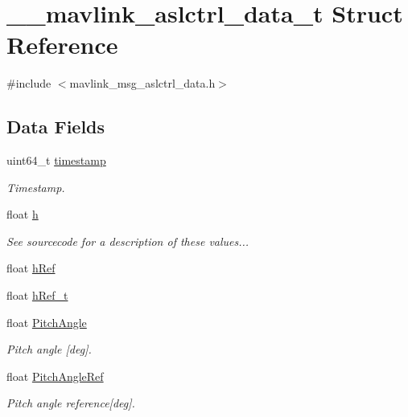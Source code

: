 \hypertarget{struct____mavlink__aslctrl__data__t}{\section{\+\_\+\+\_\+mavlink\+\_\+aslctrl\+\_\+data\+\_\+t Struct Reference}
\label{struct____mavlink__aslctrl__data__t}
}


{\ttfamily \#include $<$mavlink\+\_\+msg\+\_\+aslctrl\+\_\+data.\+h$>$}

\subsection*{Data Fields}
\begin{DoxyCompactItemize}
\item 
uint64\+\_\+t \hyperlink{struct____mavlink__aslctrl__data__t_a9258563f0773bc34200f6db9adb0fdd9}{timestamp}
\begin{DoxyCompactList}\small\item\em Timestamp. \end{DoxyCompactList}\item 
float \hyperlink{struct____mavlink__aslctrl__data__t_a957135ead069638d0b7e2feab93624f1}{h}
\begin{DoxyCompactList}\small\item\em See sourcecode for a description of these values... \end{DoxyCompactList}\item 
float \hyperlink{struct____mavlink__aslctrl__data__t_ad530ba0ec2e3dd9723667d87f42ce912}{h\+Ref}
\item 
float \hyperlink{struct____mavlink__aslctrl__data__t_a5d3d37605cac0ecb122e21160fbaa470}{h\+Ref\+\_\+t}
\item 
float \hyperlink{struct____mavlink__aslctrl__data__t_ae7d139b6ef4e79713e9685d36e02cf68}{Pitch\+Angle}
\begin{DoxyCompactList}\small\item\em Pitch angle \mbox{[}deg\mbox{]}. \end{DoxyCompactList}\item 
float \hyperlink{struct____mavlink__aslctrl__data__t_a95c3dd65b47ca1e9aa9cff522e3b229d}{Pitch\+Angle\+Ref}
\begin{DoxyCompactList}\small\item\em Pitch angle reference\mbox{[}deg\mbox{]}. \end{DoxyCompactList}\item 

\end{DoxyCompactItemize}
